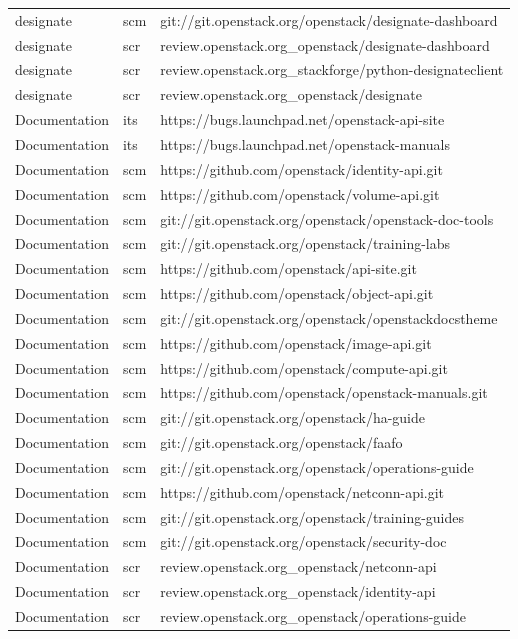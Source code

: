 \begin{center}
\begin{longtable}{|p{4cm}|p{1cm}|p{10cm}|}
designate&scm&git://git.openstack.org/openstack/designate-dashboard\\ 
designate&scr&review.openstack.org\_openstack/designate-dashboard\\ 
designate&scr&review.openstack.org\_stackforge/python-designateclient\\ 
designate&scr&review.openstack.org\_openstack/designate\\ 
Documentation&its&https://bugs.launchpad.net/openstack-api-site\\ 
Documentation&its&https://bugs.launchpad.net/openstack-manuals\\ 
Documentation&scm&https://github.com/openstack/identity-api.git\\ 
Documentation&scm&https://github.com/openstack/volume-api.git\\ 
Documentation&scm&git://git.openstack.org/openstack/openstack-doc-tools\\ 
Documentation&scm&git://git.openstack.org/openstack/training-labs\\ 
Documentation&scm&https://github.com/openstack/api-site.git\\ 
Documentation&scm&https://github.com/openstack/object-api.git\\ 
Documentation&scm&git://git.openstack.org/openstack/openstackdocstheme\\ 
Documentation&scm&https://github.com/openstack/image-api.git\\ 
Documentation&scm&https://github.com/openstack/compute-api.git\\ 
Documentation&scm&https://github.com/openstack/openstack-manuals.git\\ 
Documentation&scm&git://git.openstack.org/openstack/ha-guide\\ 
Documentation&scm&git://git.openstack.org/openstack/faafo\\ 
Documentation&scm&git://git.openstack.org/openstack/operations-guide\\ 
Documentation&scm&https://github.com/openstack/netconn-api.git\\ 
Documentation&scm&git://git.openstack.org/openstack/training-guides\\ 
Documentation&scm&git://git.openstack.org/openstack/security-doc\\ 
Documentation&scr&review.openstack.org\_openstack/netconn-api\\ 
Documentation&scr&review.openstack.org\_openstack/identity-api\\ 
Documentation&scr&review.openstack.org\_openstack/operations-guide\\ 

\end{longtable}
\end{center}
